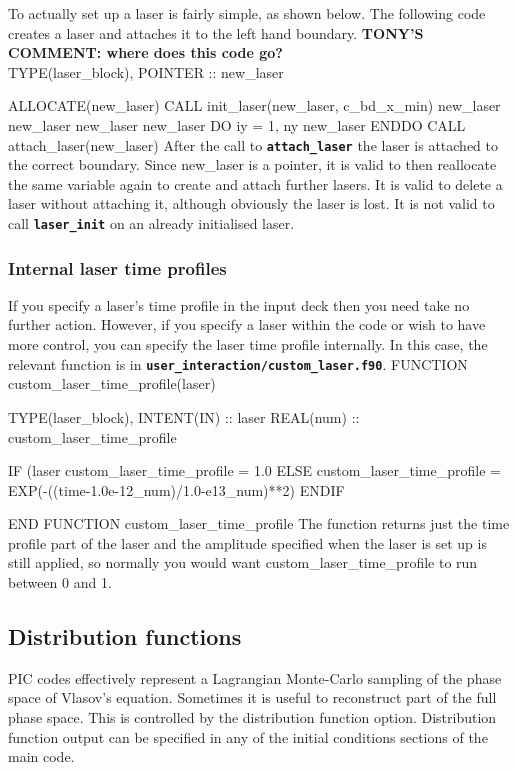 \documentclass[12pt,a4paper]{article}
\newcommand{\inlinecode}[1]{{\color{warwickred} \bf\texttt{#1}}}
\newcommand{\tony}[1]{{\color{warwickred} \bf{TONY'S COMMENT:} \bf{#1}}\\}
\newenvironment{boxverbatim}{\lboxverbatim{none}}{\endlboxverbatim}
\begin{document}
To actually set up a laser is fairly simple, as shown below. The following
code creates a laser and attaches it to the left hand boundary.
\tony{where does this code go?}
\begin{boxverbatim}
TYPE(laser_block), POINTER :: new_laser

ALLOCATE(new_laser)
CALL init_laser(new_laser, c_bd_x_min)
new_laser%
new_laser%
new_laser%
new_laser%
DO iy = 1, ny
  new_laser%
ENDDO
CALL attach_laser(new_laser)
\end{boxverbatim}
After the call to \inlinecode{attach\_laser} the laser is attached to the
correct boundary. Since new\_laser is a pointer, it is valid to then reallocate
the same variable again to create and attach further lasers. It is valid to
delete a laser without attaching it, although obviously the laser is lost. It
is not valid to call \inlinecode{laser\_init} on an already initialised laser.

\subsubsection{Internal laser time profiles}
If you specify a laser's time profile in the input deck then you need take no
further action. However, if you specify a laser within the code or wish to
have more control, you can specify the laser time profile internally. In this
case, the relevant function is in
\inlinecode{user\_interaction/custom\_laser.f90}.
\begin{boxverbatim}
FUNCTION custom_laser_time_profile(laser)

  TYPE(laser_block), INTENT(IN) :: laser
  REAL(num) :: custom_laser_time_profile

  IF (laser%
    custom_laser_time_profile = 1.0
  ELSE
    custom_laser_time_profile = EXP(-((time-1.0e-12_num)/1.0-e13_num)**2)
  ENDIF

END FUNCTION custom_laser_time_profile
\end{boxverbatim}
The function returns just the time profile part of the laser and the
amplitude specified when the laser is set up is still applied, so normally you
would want custom\_laser\_time\_profile to run between 0 and 1.

\subsection{Distribution functions}
PIC codes effectively represent a Lagrangian Monte-Carlo sampling of the phase
space of Vlasov's equation. Sometimes it is useful to reconstruct part of the
full phase space. This is controlled by the distribution function option.
Distribution function output can be specified in any of the initial conditions
sections of the main code.
\end{document}
